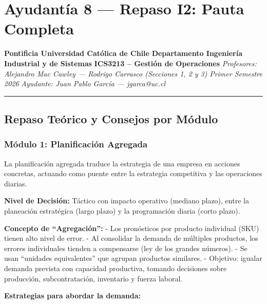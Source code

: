 \documentclass[
]{article}
\author{}
\date{}
\begin{document}
\hypertarget{ayudantuxeda-8-repaso-i2-pauta-completa}{%
\section{Ayudantía 8 --- Repaso I2: Pauta
Completa}\label{ayudantuxeda-8-repaso-i2-pauta-completa}}

\textbf{Pontificia Universidad Católica de Chile} \textbf{Departamento
Ingeniería Industrial y de Sistemas} \textbf{ICS3213 -- Gestión de
Operaciones} \emph{Profesores: Alejandro Mac Cawley --- Rodrigo Carrasco
(Secciones 1, 2 y 3)} \emph{Primer Semestre 2026} \emph{Ayudante: Juan
Pablo García --- jgarca@uc.cl}

\begin{center}\rule{0.5\linewidth}{0.5pt}\end{center}

\hypertarget{repaso-teuxf3rico-y-consejos-por-muxf3dulo}{%
\subsection{Repaso Teórico y Consejos por
Módulo}\label{repaso-teuxf3rico-y-consejos-por-muxf3dulo}}

\hypertarget{muxf3dulo-1-planificaciuxf3n-agregada}{%
\subsubsection{Módulo 1: Planificación
Agregada}\label{muxf3dulo-1-planificaciuxf3n-agregada}}

La planificación agregada traduce la estrategia de una empresa en
acciones concretas, actuando como puente entre la estrategia competitiva
y las operaciones diarias.

\textbf{Nivel de Decisión:} Táctico con impacto operativo (mediano
plazo), entre la planeación estratégica (largo plazo) y la programación
diaria (corto plazo).

\textbf{Concepto de ``Agregación'':} - Los pronósticos por producto
individual (SKU) tienen alto nivel de error. - Al consolidar la demanda
de múltiples productos, los errores individuales tienden a compensarse
(ley de los grandes números). - Se usan ``unidades equivalentes'' que
agrupan productos similares. - Objetivo: igualar demanda prevista con
capacidad productiva, tomando decisiones sobre producción,
subcontratación, inventario y fuerza laboral.

\textbf{Estrategias para abordar la demanda:}
\end{document}
